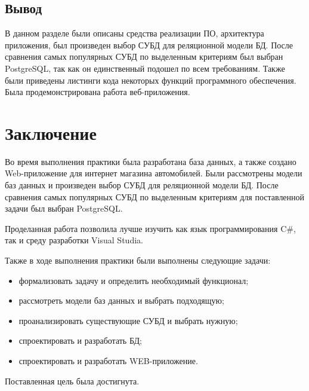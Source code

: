 \documentclass[a4paper,14pt, unknownkeysallowed]{extreport}
\begin{document}
\clearpage

\section{Вывод}

В данном разделе были описаны средства реализации ПО, архитектура приложения, был произведен выбор СУБД для реляционной модели БД. После сравнения самых популярных СУБД по выделенным критериям был выбран PostgreSQL, так как он единственный подошел по всем требованиям. Также были приведены листинги кода некоторых функций программного обеспечения. Была продемонстрирована работа веб-приложения.


\chapter*{Заключение}

Во время выполнения практики была разработана база данных, а также создано Web-приложение для интернет магазина автомобилей. Были рассмотрены модели баз данных и произведен выбор СУБД для реляционной модели БД. После сравнения самых популярных СУБД по выделенным критериям для поставленной задачи был выбран PostgreSQL.

Проделанная работа позволила лучше изучить как язык программирования C\#, так и среду разработки Visual Studia.\newline

Также в ходе выполнения практики были выполнены следующие задачи:

\begin{itemize}
	\item формализовать задачу и определить необходимый функционал;
	\item рассмотреть модели баз данных и выбрать подходящую;
	\item проанализировать существующие СУБД и выбрать нужную;
 	\item спроектировать и разработать БД;
    \item спроектировать и разработать WEB-приложение.
\end{itemize}

Поставленная цель была достигнута.
\end{document}
